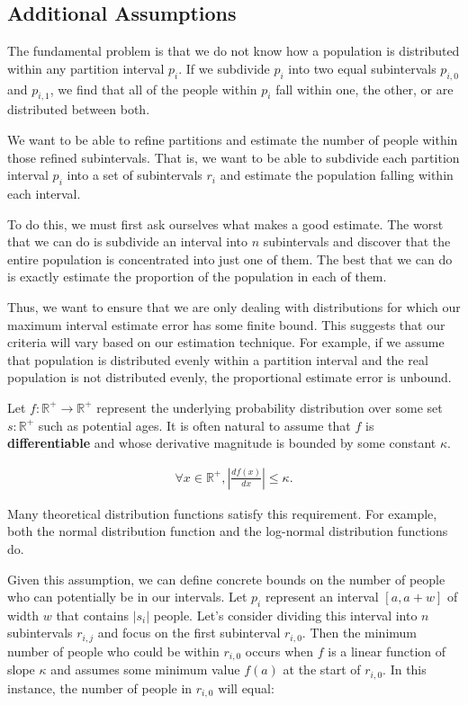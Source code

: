 \documentclass[]{article}
\begin{document}
\hypertarget{additional-assumptions}{%
\subsection{Additional Assumptions}\label{additional-assumptions}}

The fundamental problem is that we do not know how a population is
distributed within any partition interval \(p_i\). If we subdivide
\(p_i\) into two equal subintervals \(p_{i,0}\) and \(p_{i,1}\), we find
that all of the people within \(p_i\) fall within one, the other, or are
distributed between both.

We want to be able to refine partitions and estimate the number of
people within those refined subintervals. That is, we want to be able to
subdivide each partition interval \(p_i\) into a set of subintervals
\(r_i\) and estimate the population falling within each interval.

To do this, we must first ask ourselves what makes a good estimate. The
worst that we can do is subdivide an interval into \(n\) subintervals
and discover that the entire population is concentrated into just one of
them. The best that we can do is exactly estimate the proportion of the
population in each of them.

Thus, we want to ensure that we are only dealing with distributions for
which our maximum interval estimate error has some finite bound. This
suggests that our criteria will vary based on our estimation technique.
For example, if we assume that population is distributed evenly within a
partition interval and the real population is not distributed evenly,
the proportional estimate error is unbound.

Let \(f : \mathbb{R}^+ \rightarrow \mathbb{R}^+\) represent the
underlying probability distribution over some set \(s : \mathbb{R}^+\)
such as potential ages. It is often natural to assume that \(f\) is
\textbf{differentiable} and whose derivative magnitude is bounded by
some constant \(\kappa\).

\begin{align*}
\forall x \in \mathbb{R}^+, |\frac{d f (x)}{dx}| \le \kappa. 
\end{align*}

Many theoretical distribution functions satisfy this requirement. For
example, both the normal distribution function and the log-normal
distribution functions do.

Given this assumption, we can define concrete bounds on the number of
people who can potentially be in our intervals. Let \(p_i\) represent an
interval \([a, a + w]\) of width \(w\) that contains \(|s_i|\) people.
Let's consider dividing this interval into \(n\) subintervals
\(r_{i,j}\) and focus on the first subinterval \(r_{i,0}\). Then the
minimum number of people who could be within \(r_{i,0}\) occurs when
\(f\) is a linear function of slope \(\kappa\) and assumes some minimum
value \(f (a)\) at the start of \(r_{i, 0}\). In this instance, the
number of people in \(r_{i, 0}\) will equal:
\end{document}
